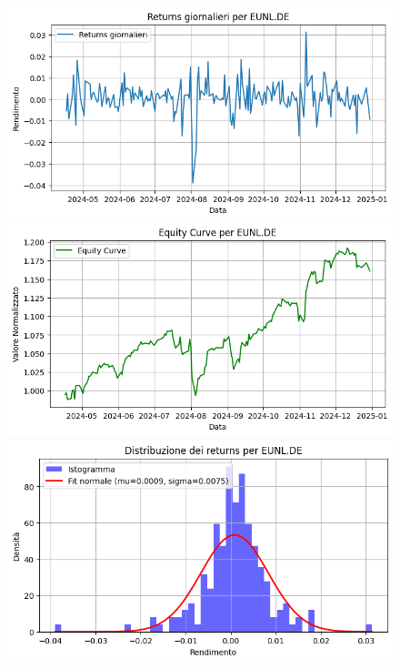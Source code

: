 \documentclass{article}%
\begin{document}
\begin{figure}[htbp]%
\begin{minipage}{0.31\textwidth}%
\includegraphics[width=\linewidth]{immagini_tickers/EUNL.DE_returns_plot.png}%
\end{minipage}%
\begin{minipage}{0.31\textwidth}%
\includegraphics[width=\linewidth]{immagini_tickers/EUNL.DE_equity_curve.png}%
\end{minipage}%
\begin{minipage}{0.31\textwidth}%
\includegraphics[width=\linewidth]{immagini_tickers/EUNL.DE_distribuzione_returns.png}%
\end{minipage}%
\end{figure}
\end{document}
